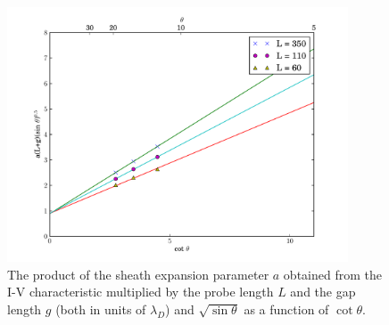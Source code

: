 


  
  
          \begin{figure}[H]
	\centering
	\includegraphics[width=0.9\textwidth]{c1_c2_plot.pdf}
	\caption{The product of the sheath expansion parameter $a$ obtained from the I-V characteristic multiplied by the probe length $L$ and the gap length $g$ (both in units of $\lambda_D$) and $\sqrt{\sin \theta}$ as a function of $\cot \theta$.}
	\label{fig:alpha}
\end{figure}

